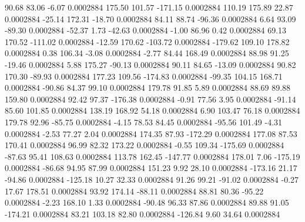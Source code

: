        90.68       83.06       -6.07     0.0002884
      175.50      101.57     -171.15     0.0002884
      110.19      175.89       22.87     0.0002884
      -25.14      172.31      -18.70     0.0002884
       84.11       88.74      -96.36     0.0002884
        6.64       93.09      -89.30     0.0002884
      -52.37        1.73      -42.63     0.0002884
       -1.00       86.96        0.42     0.0002884
       69.13      170.52     -111.02     0.0002884
      -12.59      170.62     -103.72     0.0002884
     -179.62      109.10      178.82     0.0002884
        0.38      106.34       -3.08     0.0002884
       -2.77       84.44      168.49     0.0002884
       88.98       91.25      -19.46     0.0002884
        5.88      175.27      -90.13     0.0002884
       90.11       84.65      -13.09     0.0002884
       90.82      170.30      -89.93     0.0002884
      177.23      109.56     -174.83     0.0002884
      -99.35      104.15      168.71     0.0002884
      -90.86       84.37       99.10     0.0002884
      179.78       91.85        5.89     0.0002884
       88.69       89.88      159.80     0.0002884
       92.42       97.37     -176.38     0.0002884
       -0.91       77.56        3.95     0.0002884
      -91.14       85.60      101.85     0.0002884
      138.19      168.92       54.18     0.0002884
        6.90      103.47       76.18     0.0002884
      179.78       92.96      -85.75     0.0002884
       -4.15       78.53       84.45     0.0002884
      -95.56      101.49       -4.31     0.0002884
       -2.53       77.27        2.04     0.0002884
      174.35       87.93     -172.29     0.0002884
      177.08       87.53      170.41     0.0002884
       96.99       82.32      173.22     0.0002884
       -0.55      109.34     -175.69     0.0002884
      -87.63       95.41      108.63     0.0002884
      113.78      162.45     -147.77     0.0002884
      178.01        7.06     -175.19     0.0002884
      -86.68       94.95       87.99     0.0002884
      151.23        9.92       28.10     0.0002884
     -173.16       21.17      -94.86     0.0002884
     -125.18       10.27       32.33     0.0002884
       91.26       99.21      -91.02     0.0002884
       -0.27       17.67      178.51     0.0002884
       93.92      174.14      -88.11     0.0002884
       88.81       80.36      -95.22     0.0002884
       -2.23      168.10        1.33     0.0002884
      -90.48       96.33       87.86     0.0002884
       89.88       91.05     -174.21     0.0002884
       83.21      103.18       82.80     0.0002884
     -126.84        9.60       34.64     0.0002884
